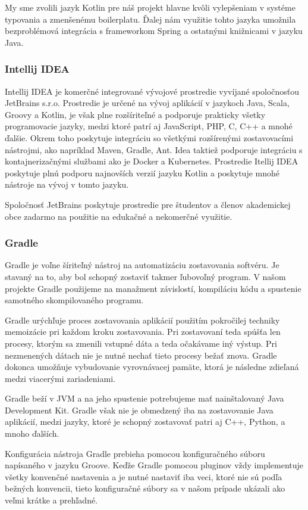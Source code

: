 My sme zvolili jazyk Kotlin pre náš projekt hlavne kvôli vylepšeniam v systéme typovania a zmenšenému boilerplatu. Ďalej nám využitie tohto jazyka umožnila bezproblémová integrácia s frameworkom Spring a ostatnými knižnicami v jazyku Java.	

\subsubsection{Intellij IDEA}
Intellij IDEA je komerčné integrované vývojové prostredie vyvíjané spoločnosťou JetBrains s.r.o. Prostredie je určené na vývoj aplikácií v jazykoch Java, Scala, Groovy a Kotlin, je však plne rozšíriteľné a podporuje prakticky všetky programovacie jazyky, medzi ktoré patrí aj JavaScript, PHP, C, C++ a mnohé ďalšie. Okrem toho poskytuje integráciu so všetkými rozšírenými zostavovacími nástrojmi, ako napríklad Maven, Gradle, Ant. Idea taktiež podporuje integráciu s kontajnerizačnými službami ako je Docker a Kubernetes. Prostredie Itellij IDEA poskytuje plnú podporu najnovších verzií jazyku Kotlin a poskytuje mnohé nástroje na vývoj v tomto jazyku.

Spoločnosť JetBrains poskytuje prostredie pre študentov a členov akademickej obce zadarmo na použitie na edukačné a nekomerčné využitie. 


\subsubsection{Gradle}
Gradle je voľne šíriteľný nástroj na automatizáciu zostavovania softvéru. Je stavaný na to, aby bol schopný zostaviť takmer ľubovoľný program.  V našom projekte Gradle použijeme na manažment závislostí, kompiláciu kódu a spustenie samotného skompilovaného programu. 

Gradle urýchľuje proces zostavovania aplikácií použitím pokročilej techniky memoizácie pri každom kroku zostavovania. Pri zostavovaní teda spúšťa len procesy, ktorým sa zmenili vstupné dáta  a teda očakávame iný výstup. Pri nezmenených dátach nie je nutné nechať tieto procesy bežať znova. Gradle dokonca umožňuje vybudovanie vyrovnávacej pamäte, ktorá je následne zdieľaná medzi viacerými zariadeniami.

Gradle beží v JVM a na jeho spustenie potrebujeme mať nainštalovaný Java Development Kit. Gradle však nie je obmedzený iba na zostavovanie Java aplikácií, medzi jazyky, ktoré je schopný zostavovať patri aj C++, Python, a mnoho ďalších.

Konfigurácia nástroja Gradle prebieha pomocou konfiguračného súboru napísaného v jazyku Groove. Keďže Gradle pomocou pluginov vždy implementuje všetky konvenčné nastavenia a je nutné nastaviť iba veci, ktoré nie sú podľa bežných konvencii, tieto konfiguračné  súbory sa v našom prípade ukázali ako veľmi krátke a prehľadné. 

